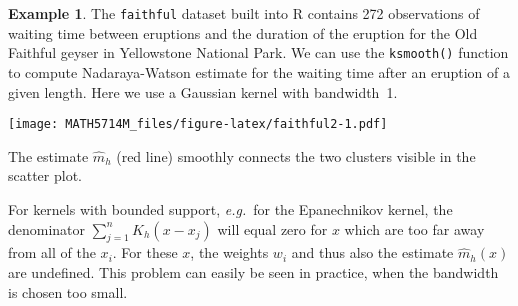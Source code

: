 \documentclass[
  a4paper,
]{article}
\newenvironment{Shaded}{\begin{snugshade}}{\end{snugshade}}
\newcommand{\AttributeTok}[1]{\textcolor[rgb]{0.77,0.63,0.00}{#1}}
\newcommand{\DecValTok}[1]{\textcolor[rgb]{0.00,0.00,0.81}{#1}}
\newcommand{\FunctionTok}[1]{\textcolor[rgb]{0.00,0.00,0.00}{#1}}
\newcommand{\NormalTok}[1]{#1}
\newcommand{\OtherTok}[1]{\textcolor[rgb]{0.56,0.35,0.01}{#1}}
\newcommand{\SpecialCharTok}[1]{\textcolor[rgb]{0.00,0.00,0.00}{#1}}
\newcommand{\StringTok}[1]{\textcolor[rgb]{0.31,0.60,0.02}{#1}}
\theoremstyle{definition}
\theoremstyle{definition}
\newtheorem{example}{Example}[section]
\theoremstyle{definition}
\theoremstyle{definition}
\theoremstyle{remark}
\begin{document}
\begin{example}
\protect\hypertarget{exm:faithful}{}\label{exm:faithful}The \texttt{faithful} dataset built into R contains 272 observations of
waiting time between eruptions and the duration of the eruption for the Old Faithful geyser in Yellowstone National Park. We can use the
\texttt{ksmooth()} function to compute Nadaraya-Watson estimate for the
waiting time after an eruption of a given length. Here we use
a Gaussian kernel with bandwidth~1.

\begin{Shaded}
\end{Shaded}

\texttt{[image: MATH5714M\_files/figure-latex/faithful2-1.pdf]}

The estimate \(\hat m_h\) (red line) smoothly connects the two clusters
visible in the scatter plot.
\end{example}

For kernels with bounded support, \emph{e.g.}~for the Epanechnikov kernel,
the denominator \(\sum_{j=1}^n K_h(x - x_j)\) will equal zero for \(x\)
which are too far away from all of the \(x_i\). For these \(x\), the weights
\(w_i\) and thus also the estimate \(\hat m_h(x)\) are undefined. This
problem can easily be seen in practice, when the bandwidth is chosen
too small.
\end{document}
